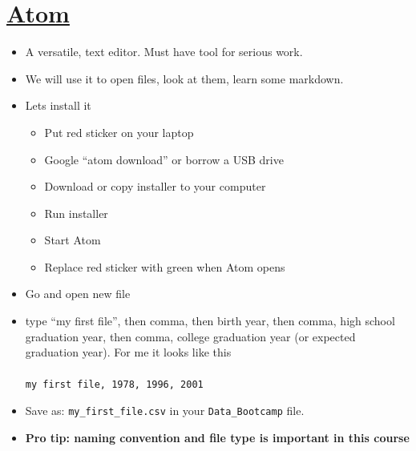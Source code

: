 \section*{\href{https://atom.io/}{Atom}}
\begin{itemize}
\item A versatile, text editor. Must have tool for serious work.
\item We will use it to open files, look at them, learn some markdown.
\item Lets install it
\begin{itemize}
\item Put red sticker on your laptop
\item Google ``atom download'' or borrow a USB drive
\item Download or copy installer to your computer
\item Run installer
\item Start Atom
\item Replace red sticker with green when Atom opens
\end{itemize}
\item Go and open new file
\item type ``my first file'', then comma, then birth year, then comma, high school graduation year, then comma, college graduation year (or expected graduation year). For me it looks like this\\
    \\
{\tt my first file, 1978, 1996, 2001} 
\item Save as: \verb|my_first_file.csv| in your \verb|Data_Bootcamp| file.
\item \textbf{Pro tip: naming convention and file type is important in this course}
\end{itemize}


